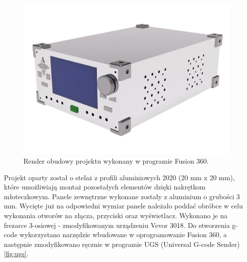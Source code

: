 \begin{figure}[h!]
    \begin{center}
        \includegraphics[width = 17cm]{images/obudowa_render-removebg.png}
        \caption{Render obudowy projektu wykonany w programie Fusion 360.} 
        \label{fig:mechanical_Render}
    \end{center}
\end{figure}

Projekt oparty został o stelaż z profili aluminiowych 2020 (20 mm x 20 mm), które umożliwiają montaż pozostałych elementów
dzięki nakrętkom młoteczkowym. Panele zewnętrzne wykonane zostały z aluminium o grubości 3 mm. Wycięte już na odpowiedni wymiar 
panele należało poddać obróbce w celu wykonania otworów na złącza, przyciski oraz wyświetlacz. Wykonano je na frezarce 
3-osiowej - zmodyfikowanym urządzeniu Vevor 3018. Do stworzenia g-code wykorzystano narzędzie wbudowane w oprogramowanie 
Fusion 360, a następnie zmodyfikowano ręcznie w programie UGS (Universal G-code Sender) \ref{fig:ugs}.

